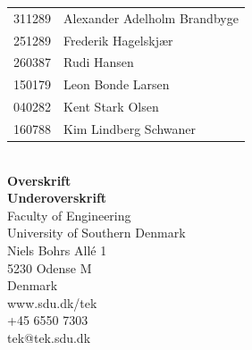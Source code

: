 \begin{titlepage}
\begin{tabular}{@{}l l}
	\textsf{\large{311289}} & \textsf{\large{Alexander Adelholm Brandbyge}}\\
	\textsf{\large{251289}} & \textsf{\large{Frederik Hagelskjær}}\\
	\textsf{\large{260387}} & \textsf{\large{Rudi Hansen}}\\
	\textsf{\large{150179}} & \textsf{\large{Leon Bonde Larsen}}\\
	\textsf{\large{040282}} & \textsf{\large{Kent Stark Olsen}}\\
	\textsf{\large{160788}} & \textsf{\large{Kim Lindberg Schwaner}}
\end{tabular}
\setlength{\extrarowheight}{0pt}
\vspace*{1.5cm}
\\
\textsf{\Huge{\textbf{\textcolor{FrontpageHeadingColor}{Overskrift}}}}
\vspace*{0.5cm}
\\
\textsf{\Large{\textbf{\textcolor{FrontpageHeadingColor}{Underoverskrift}}}}
\vfill
\textsf{\\Faculty of Engineering\\
University of Southern Denmark\\
Niels Bohrs Allé 1\\
5230 Odense M\\
Denmark}
\vspace*{10pt}
\\
\textsf{www.sdu.dk/tek\\
+45 6550 7303\\
tek@tek.sdu.dk}
\end{titlepage}%
